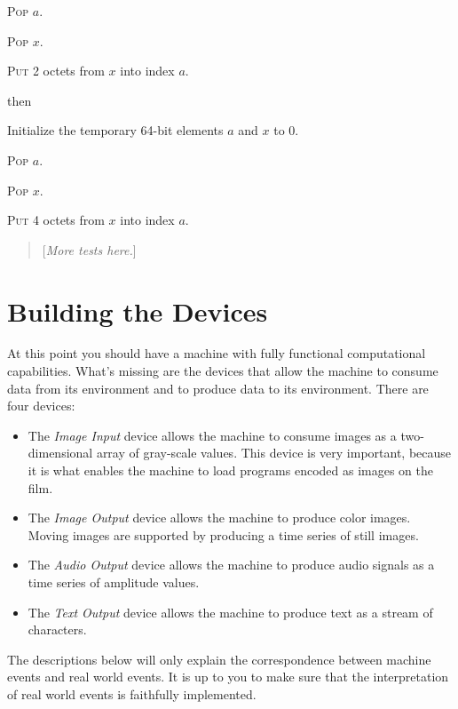 \documentclass[a4paper,12pt]{article}
\newcommand{\num}[1]{\texttt{#1}}
\newcommand{\hex}[1]{\num{#1}_{\textup{\tiny 16}}}
\newcommand{\proc}[1]{\textsc{#1}}
\newcommand{\comment}[1]{\begin{quote}[\textit{#1}]\end{quote}}
\newcommand{\op}[1]{$#1$}
\newcommand{\STOREI}    [1]{\op{\hex{16}}}
\begin{document}
\begin{stepnumbers}[start=3]
\begin{description}
\begin{stepnumbers}
    \item \proc{Pop} $a$.
    \item \proc{Pop} $x$.
    \item \proc{Put} 2 octets from $x$ into index $a$.
    \end{stepnumbers}
  \item[\STOREI{}] then
    \begin{stepnumbers}
    \item Initialize the temporary 64-bit elements $a$ and $x$ to 0.
    \item \proc{Pop} $a$.
    \item \proc{Pop} $x$.
    \item \proc{Put} 4 octets from $x$ into index $a$.
    \end{stepnumbers}
  \end{description}
\end{stepnumbers}

\comment{More tests here.}

\section{Building the Devices}
\label{sec:building-devices}

At this point you should have a machine with fully functional computational capabilities.
What's missing are the devices that allow the machine to consume data from its environment and to produce data to its environment.
There are four devices:
\begin{itemize}
\item The \emph{Image Input} device allows the machine to consume images as a two-dimensional array of gray-scale values.
  This device is very important, because it is what enables the machine to load programs encoded as images on the film.
\item The \emph{Image Output} device allows the machine to produce color images.
  Moving images are supported by producing a time series of still images.
\item The \emph{Audio Output} device allows the machine to produce audio signals as a time series of amplitude values.
\item The \emph{Text Output} device allows the machine to produce text as a stream of characters.
\end{itemize}
The descriptions below will only explain the correspondence between machine events and real world events.
It is up to you to make sure that the interpretation of real world events is faithfully implemented.
\end{document}
